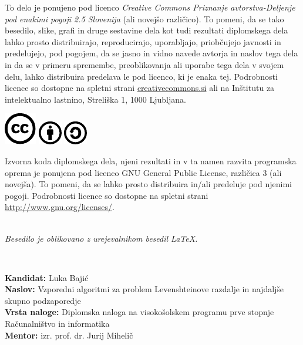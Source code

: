 \documentclass[a4paper,12pt,openright]{book}
\newcommand{\clearemptydoublepage}{\newpage{\pagestyle{empty}\cleardoublepage}}
\newcommand{\CcImageCc}[1]{%
	\includegraphics[scale=#1]{cc_cc_30.pdf}%
}
\newcommand{\CcImageBy}[1]{%
	\includegraphics[scale=#1]{cc_by_30.pdf}%
}
\newcommand{\CcImageSa}[1]{%
	\includegraphics[scale=#1]{cc_sa_30.pdf}%
}
\begin{document}
\newpage
\thispagestyle{empty}

\vspace*{5cm}
{\small \noindent
To delo je ponujeno pod licenco \textit{Creative Commons Priznanje avtorstva-Deljenje pod enakimi pogoji 2.5 Slovenija} (ali novej\v so razli\v cico).
To pomeni, da se tako besedilo, slike, grafi in druge sestavine dela kot tudi rezultati diplomskega dela lahko prosto distribuirajo,
reproducirajo, uporabljajo, priobčujejo javnosti in predelujejo, pod pogojem, da se jasno in vidno navede avtorja in naslov tega
dela in da se v primeru spremembe, preoblikovanja ali uporabe tega dela v svojem delu, lahko distribuira predelava le pod
licenco, ki je enaka tej.
Podrobnosti licence so dostopne na spletni strani \href{http://creativecommons.si}{creativecommons.si} ali na Inštitutu za
intelektualno lastnino, Streliška 1, 1000 Ljubljana.

\vspace*{1cm}
\begin{center}%
\CcImageCc{0.741573033707865}\hspace*{1ex}\CcImageBy{1}\hspace*{1ex}\CcImageSa{1}%
\end{center}
}

\vspace*{1cm}
{\small \noindent
Izvorna koda diplomskega dela, njeni rezultati in v ta namen razvita programska oprema je ponujena pod licenco GNU General Public License,
različica 3 (ali novejša). To pomeni, da se lahko prosto distribuira in/ali predeluje pod njenimi pogoji.
Podrobnosti licence so dostopne na spletni strani \url{http://www.gnu.org/licenses/}.
}

\vfill
\begin{center} 
\ \\ \vfill
{\em
Besedilo je oblikovano z urejevalnikom besedil \LaTeX.}
\end{center}

\clearemptydoublepage

\thispagestyle{empty}
\
\vfill

\bigskip
\noindent\textbf{Kandidat:} Luka Bajić\\
\noindent\textbf{Naslov:} Vzporedni algoritmi za problem Levenshteinove razdalje in najdaljše skupno podzaporedje\\
\noindent\textbf{Vrsta naloge:} Diplomska naloga na visokošolskem programu prve stopnje Računalništvo in informatika \\
\noindent\textbf{Mentor:} izr. prof. dr. Jurij Mihelič\\
\end{document}

